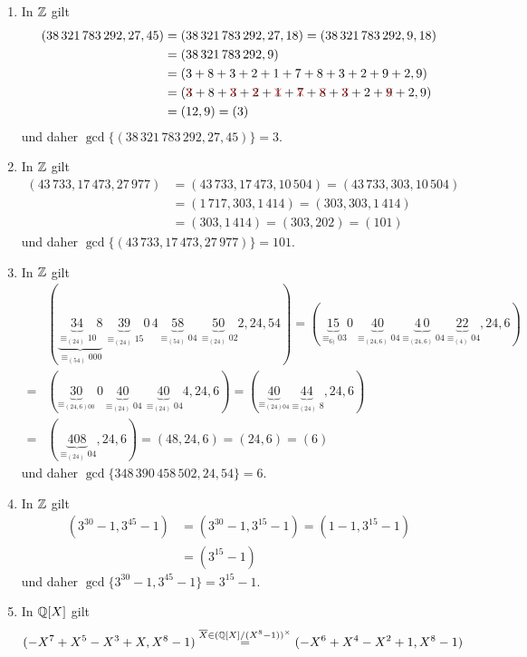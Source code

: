 \documentclass[../../main.tex]{subfiles}
\begin{document}
\begin{bsp}\label{16.3.2}
\begin{enumerate}[\normalfont(a)]
\item In $\mathbb Z$ gilt
\begin{align*}
(38\,321\,783\,292,27,45)&=(38\,321\,783\,292,27,18)=(38\,321\,783\,292,9,18)\\
&=(38\,321\,783\,292,9)\\
&=(3+8+3+2+1+7+8+3+2+9+2,9)\\
&=(\cancel 3+8+\cancel 3+\cancel 2+\cancel 1+\cancel 7+\cancel 8+\cancel 3+2+\cancel 9+2,9)\\
&=(12,9)=(3)
\end{align*}
und daher $\gcd\{(38\,321\,783\,292,27,45)\}=3$.
\item In $\mathbb Z$ gilt
\begin{align*}
(43\,733,17\,473,27\,977)&=(43\,733,17\,473,10\,504)=(43\,733,303,10\,504)\\
&=(1\,717,303,1\,414)=(303,303,1\,414)\\
&=(303,1\,414)=(303,202)=(101)
\end{align*}
und daher $\gcd\{(43\,733,17\,473,27\,977)\}=101$.
\item In $\mathbb Z$ gilt
\begin{align*}
&(\underbrace{\underbrace{34}_{\equiv_{(24)}10}8}_{\equiv_{(54)}000}\,\underbrace{39}_{\equiv_{(24)}15}0\,4\underbrace{58}_{\equiv_{(54)}04}\,\underbrace{50}_{\equiv_{(24)}02}2,24,54)=(\underbrace{15}_{\equiv_{6)}03}0\,\underbrace{40}_{\equiv_{(24,6)}04}\underbrace{4\,0}_{\equiv_{(24,6)}04}\underbrace{22}_{\equiv_{(4)}04},24,6)\\
=&(\underbrace{30}_{\equiv_{(24,6)00}}\,0\underbrace{40}_{\equiv_{(24)}04}\,\underbrace{40}_{\equiv_{(24)}04}4,24,6)=(\underbrace{40}_{\equiv_{(24)04}}\underbrace{44}_{\equiv_{(24)}8},24,6)\\
=&(\underbrace{408}_{\equiv_{(24)}04},24,6)=(48,24,6)=(24,6)=(6)
\end{align*}
und daher $\gcd\{348\,390\,458\,502,24,54\}=6$.
\item In $\mathbb Z$ gilt
\begin{align*}
(3^{30}-1,3^{45}-1)&=(3^{30}-1,3^{15}-1)=(1-1,3^{15}-1)\\
&=(3^{15}-1)
\end{align*}
und daher $\gcd\{3^{30}-1,3^{45}-1\}=3^{15}-1$.
\item In $\mathbb Q[X]$ gilt
\begin{align*}
&(-X^7+X^5-X^3+X,X^8-1)\stackrel{\overline{X}\in (\Q[X]/(X^8-1))^\times}{=}(-X^6+X^4-X^2+1,X^8-1)\\

\end{align*}
\end{enumerate}
\end{bsp}
\end{document}
